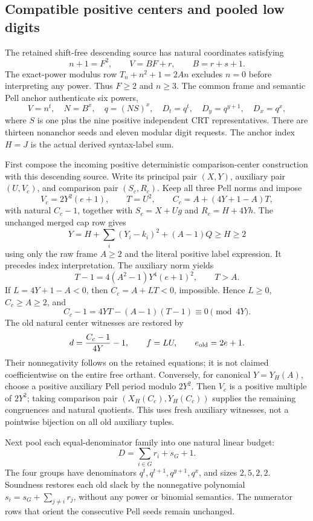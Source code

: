 \subsection{Compatible positive centers and pooled low digits}

The retained shift-free descending source has natural coordinates satisfying
\[
 n+1=F^2,\qquad V=BF+r,\qquad B=r+s+1.
 \tag{N1}
\]
The exact-power modulus row \(T_n+n^2+1=2An\) excludes \(n=0\) before
interpreting any power.  Thus \(F\ge2\) and \(n\ge3\).  The common frame
and semantic Pell anchor authenticate six powers,
\[
 V=n^t,\quad N=B^x,\quad q=(NS)^x,\quad
 D_t=q^t,\quad D_y=q^{y+1},\quad D_x=q^x,
 \tag{N2}
\]
where \(S\) is one plus the nine positive independent CRT representatives.
There are thirteen nonanchor seeds and eleven modular digit requests.
The anchor index \(H=J\) is the actual derived syntax-label sum.

First compose the incoming positive deterministic comparison-center
construction with this descending source.  Write its principal pair
\((X,Y)\), auxiliary pair \((U,V_c)\), and comparison pair
\((S_c,R_c)\).  Keep all three Pell norms and impose
\[
 V_c=2Y^2(e+1),\qquad T=U^2,\qquad
 C_c=A+(4Y+1-A)T,
 \tag{N3}
\]
with natural \(C_c-1\), together with
\(S_c=X+Ug\) and \(R_c=H+4Yh\).
The unchanged merged cap row gives
\[
 Y=H+\sum_i(Y_i-k_i)^2+(A-1)Q\ge H\ge2
\]
using only the raw frame \(A\ge2\) and the literal positive label expression.
It precedes index interpretation.  The auxiliary norm yields
\[
 T-1=4(A^2-1)Y^4(e+1)^2,\qquad T>A.
\]
If \(L=4Y+1-A<0\), then \(C_c=A+LT<0\), impossible.  Hence
\(L\ge0\), \(C_c\ge A\ge2\), and
\[
 C_c-1=4YT-(A-1)(T-1)\equiv0\pmod {4Y}.
\]
The old natural center witnesses are restored by
\[
 d=\frac{C_c-1}{4Y}-1,\qquad f=LU,\qquad e_{\rm old}=2e+1.
\]
Their nonnegativity follows on the retained equations; it is not claimed
coefficientwise on the entire free orthant.  Conversely, for canonical
\(Y=Y_H(A)\), choose a positive auxiliary Pell period modulo \(2Y^2\).
Then \(V_c\) is a positive multiple of \(2Y^2\); taking comparison pair
\((X_H(C_c),Y_H(C_c))\) supplies the remaining congruences and natural
quotients.  This uses fresh auxiliary witnesses, not a pointwise bijection
on all old auxiliary tuples.

Next pool each equal-denominator family into one natural linear budget:
\[
 D=\sum_{i\in G}r_i+s_G+1.
 \tag{N4}
\]
The four groups have denominators \(q^t,q^{t+1},q^{y+1},q^x\), and sizes
\(2,5,2,2\).  Soundness restores each old slack by the nonnegative
polynomial \(s_i=s_G+\sum_{j\ne i}r_j\), without any power or binomial
semantics.  The numerator rows that orient the consecutive Pell seeds
remain unchanged.

